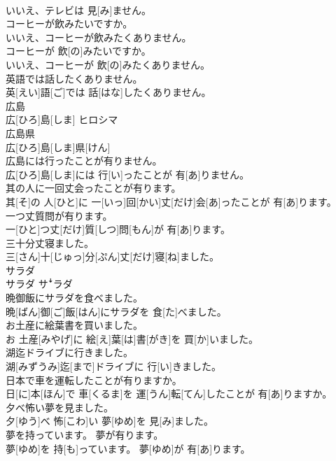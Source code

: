 \documentclass[8pt]{extreport}
\begin{document}
\begin{CJK}{UTF8}{min}
\\	いいえ、テレビは 見[み]ません。
\\	コーヒーが飲みたいですか。 
\\	いいえ、コーヒーが飲みたくありません。	
\\	コーヒーが 飲[の]みたいですか。 
\\	いいえ、コーヒーが 飲[の]みたくありません。
\\	英語では話したくありません。	
\\	英[えい]語[ご]では 話[はな]したくありません。
\\	広島	
\\	広[ひろ]島[しま]	ヒロシマ
\\	広島県	
\\	広[ひろ]島[しま]県[けん]	
\\	広島には行ったことが有りません。	
\\	広[ひろ]島[しま]には 行[い]ったことが 有[あ]りません。
\\	其の人に一回丈会ったことが有ります。	
\\	其[そ]の 人[ひと]に 一[いっ]回[かい]丈[だけ]会[あ]ったことが 有[あ]ります。
\\	一つ丈質問が有ります。	
\\	一[ひと]つ丈[だけ]質[しつ]問[もん]が 有[あ]ります。
\\	三十分丈寝ました。	
\\	三[さん]十[じゅっ]分[ぷん]丈[だけ]寝[ね]ました。
\\	サラダ	
\\	サラダ	サꜜラダ
\\	晩御飯にサラダを食べました。	
\\	晩[ばん]御[ご]飯[はん]にサラダを 食[た]べました。
\\	お土産に絵葉書を買いました。	
\\	お 土産[みやげ]に 絵[え]葉[は]書[がき]を 買[か]いました。
\\	湖迄ドライブに行きました。	
\\	湖[みずうみ]迄[まで]ドライブに 行[い]きました。
\\	日本で車を運転したことが有りますか。	
\\	日[に]本[ほん]で 車[くるま]を 運[うん]転[てん]したことが 有[あ]りますか。
\\	夕べ怖い夢を見ました。	
\\	夕[ゆう]べ 怖[こわ]い 夢[ゆめ]を 見[み]ました。
\\	夢を持っています。 夢が有ります。	
\\	夢[ゆめ]を 持[も]っています。 夢[ゆめ]が 有[あ]ります。

\end{CJK}
\end{document}
